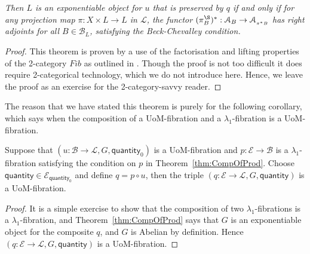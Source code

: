 \documentclass[a4paper,UKenglish]{lipics}
\newcommand{\LamOneFib}{$\lambda_1$-fibration\xspace}
\newcommand{\LamOneFibs}{$\lambda_1$-fibrations\xspace}
\newcommand{\msf}[1]{\mathsf{#1}} %
\newcommand{\A}{\mathcal{A}}
\newcommand{\B}{\mathcal{B}}
\newcommand{\E}{\mathcal{E}}
\newcommand{\fibre}[2]{#1_{_{#2}}}
\newcommand{\num}{\msf{quantity}}
\begin{document}
\noindent \emph{Then $L$ is an exponentiable object for $u$ that is preserved by $q$ if and only if for any projection map $\pi : X \times L \rightarrow L$ in $\mathcal{L}$, the functor $(\pi^\S_B)^\ast : \A_B \rightarrow \fibre{\A}{\pi^\ast B}$ has right adjoints for all $B \in \B_L$, satisfying the Beck-Chevalley condition.}






\begin{proof}
This theorem is proven by a use of the factorisation and lifting properties of the 2-category $Fib$ as outlined in \cite{hermida1999some}. Though the proof is not too difficult it does require 2-categorical technology, which we do not introduce here. Hence, we leave the proof as an exercise for the 2-category-savvy reader.
\end{proof}

The reason that we have stated this theorem is purely for the following corollary, which says when the composition of a UoM-fibration and a \LamOneFib is a UoM-fibration.

\begin{corollary}
\label{cor:UoMAndLamOne}
Suppose that $(u:\B \rightarrow \mathcal{L}, G, \num_0)$ is a UoM-fibration and $p: \E \rightarrow \B$ is a \LamOneFib satisfying the condition on $p$ in Theorem~\ref{thm:CompOfProd}. Choose $\num \in \E_{\num_0}$ and define $q = p \circ u$, then the triple $(q : \E \rightarrow \mathcal{L}, G, \num)$ is a UoM-fibration.
\end{corollary}

\begin{proof}
It is a simple exercise to show that the composition of two \LamOneFibs is a \LamOneFib, and Theorem~\ref{thm:CompOfProd} says that $G$ is an exponentiable object for the composite $q$, and $G$ is Abelian by definition. Hence $(q : \E \rightarrow \mathcal{L}, G, \num)$ is a UoM-fibration.
\end{proof}
\end{document}
